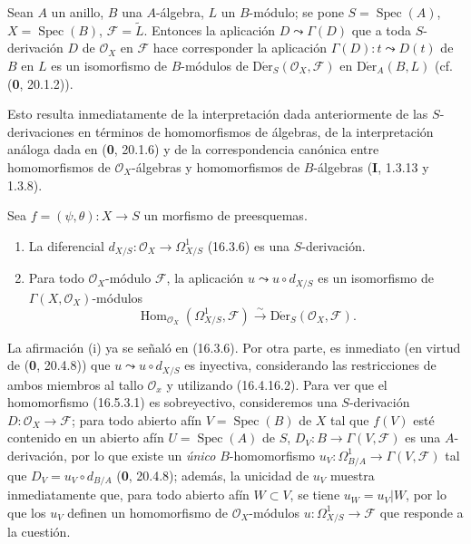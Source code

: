\begin{proposition}[16.5.2]
\label{IV.16.5.2}
Sean $A$ un anillo, $B$ una $A$-álgebra, $L$ un $B$-módulo; se pone
$S=\operatorname{Spec}(A)$, $X=\operatorname{Spec}(B)$,
$\mathscr{F}=\widetilde{L}$. Entonces la aplicación $D\leadsto\Gamma(D)$ que a
toda $S$-derivación $D$ de $\mathcal{O}_X$ en $\mathscr{F}$ hace
corresponder la aplicación $\Gamma(D):t\leadsto D(t)$ de $B$ en $L$ es un
isomorfismo de $B$-módulos de
$\operatorname{D\acute{e}r}_S(\mathcal{O}_X,\mathscr{F})$ en
$\operatorname{D\acute{e}r}_A(B,L)$ \textup{(cf. (\textbf 0, 20.1.2))}.
\end{proposition}

Esto resulta inmediatamente de la interpretación dada anteriormente de las $S$-derivaciones
en términos
de homomorfismos de álgebras, de la interpretación análoga dada en
(\textbf 0, 20.1.6) y de la correspondencia canónica entre homomorfismos de
$\mathcal{O}_X$-álgebras y homomorfismos de $B$-álgebras (\textbf I, 1.3.13 y
1.3.8).

\begin{proposition}[16.5.3]
\label{IV.16.5.3}
Sea $f=(\psi,\theta):X\to S$ un morfismo de preesquemas.
\begin{enumerate}
\item[\textup{(i)}] La diferencial
$d_{X/S}:\mathcal{O}_X\to\varOmega_{X/S}^1$ \textup{(16.3.6)} es una $S$-derivación.
\item[\textup{(ii)}] Para todo $\mathcal{O}_X$-módulo $\mathscr{F}$, la aplicación
$u\leadsto u\circ d_{X/S}$ es un isomorfismo de
$\Gamma(X,\mathcal{O}_X)$-módulos
\[
  \operatorname{Hom}_{\mathcal{O}_X}(\varOmega_{X/S}^1,\mathscr{F})
  \xrightarrow{\sim}
  \operatorname{D\acute{e}r}_S(\mathcal{O}_X,\mathscr{F}).
  \tag{16.5.3.1}
  \label{IV.16.5.3.1}
\]
\end{enumerate}
\end{proposition}

La afirmación (i) ya se señaló en (16.3.6). Por otra parte, es inmediato (en
virtud de (\textbf 0, 20.4.8)) que $u\leadsto u\circ d_{X/S}$ es inyectiva, considerando
las restricciones de ambos miembros al tallo $\mathcal{O}_x$ y utilizando
(16.4.16.2). Para ver que el homomorfismo (16.5.3.1) es sobreyectivo,
consideremos una $S$-derivación $D:\mathcal{O}_X\to\mathscr{F}$; para todo
abierto afín $V=\operatorname{Spec}(B)$ de $X$ tal que $f(V)$ esté contenido
en un abierto afín $U=\operatorname{Spec}(A)$ de $S$,
$D_V:B\to\Gamma(V,\mathscr{F})$ es una $A$-derivación, por lo que existe un
\emph{único} $B$-homomorfismo
$u_V:\Omega_{B/A}^1\to\Gamma(V,\mathscr{F})$ tal que
$D_V=u_V\circ d_{B/A}$ (\textbf 0, 20.4.8); además, la unicidad de $u_V$ muestra
inmediatamente que, para todo abierto afín $W\subset V$, se tiene $u_W=u_V|W$, por lo que los
$u_V$ definen un homomorfismo de $\mathcal{O}_X$-módulos
$u:\varOmega_{X/S}^1\to\mathscr{F}$ que responde a la cuestión.

